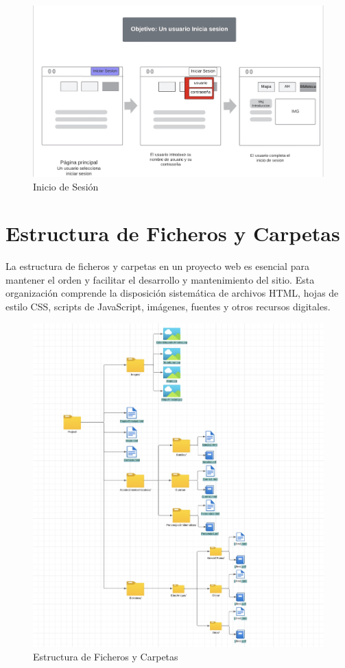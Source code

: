 \documentclass{article}
\begin{document}
\begin{figure}[H]
    \centering
    \includegraphics[width=1\textwidth]{Storyboards/StroryBoardInicioSesion.jpg}
    \caption{Inicio de Sesión}
    \label{fig:mi_imagen}
\end{figure}

\newpage

\section{Estructura de Ficheros y Carpetas}

La estructura de ficheros y carpetas en un proyecto web es esencial para mantener el orden y facilitar el desarrollo y mantenimiento del sitio. Esta organización comprende la disposición sistemática de archivos HTML, hojas de estilo CSS, scripts de JavaScript, imágenes, fuentes y otros recursos digitales.

\begin{figure}[H]
    \centering
    \includegraphics[width=1\textwidth]{Esquemas/EstructuraDeFicheros.jpg}
    \caption{Estructura de Ficheros y Carpetas}
    \label{fig:mi_imagen}
\end{figure}
\end{document}
